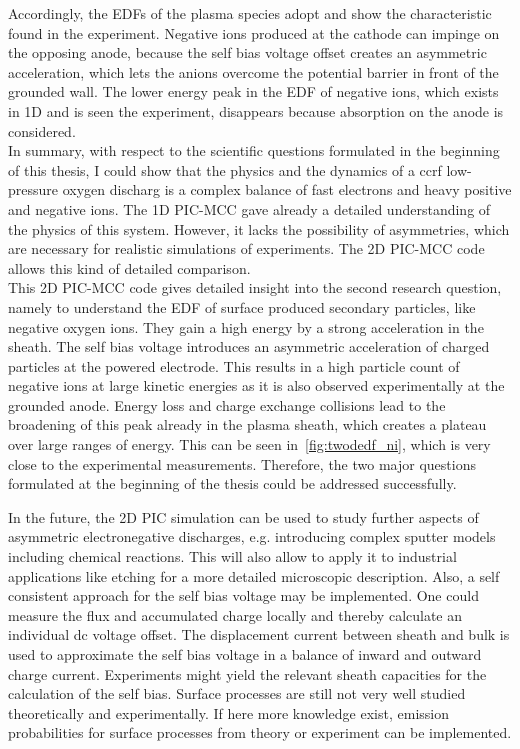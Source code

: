    Accordingly, the EDFs of the plasma species adopt and show the characteristic found in the experiment. Negative ions produced at the cathode can impinge on the opposing anode, because the self bias voltage offset creates an asymmetric acceleration, which lets the anions overcome the potential barrier in front of the grounded wall. The lower energy peak in the EDF of negative ions, which exists in 1D and is seen the experiment, disappears because absorption on the anode is considered.\\
    In summary, with respect to the scientific questions formulated in the beginning of this thesis, I could show that the physics and the dynamics of a ccrf low-pressure oxygen discharg is a complex balance of fast electrons and heavy positive and negative ions. The 1D PIC-MCC gave already a detailed understanding of the physics of this system. However, it lacks the possibility of asymmetries, which are necessary for realistic simulations of experiments. The 2D PIC-MCC code allows this kind of detailed comparison.\\
    This 2D PIC-MCC code gives detailed insight into the second research question, namely to understand the EDF of surface produced secondary particles, like negative oxygen ions. They gain a high energy by a strong acceleration in the sheath. The self bias voltage introduces an asymmetric acceleration of charged particles at the powered electrode. This results in a high particle count of negative ions at large kinetic energies as it is also observed experimentally at the grounded anode. Energy loss and charge exchange collisions lead to the broadening of this peak already in the plasma sheath, which creates a plateau over large ranges of energy. This can be seen in~\autoref{fig:twodedf_ni}, which is very close to the experimental measurements.
Therefore, the two major questions formulated at the beginning of the thesis could be addressed successfully.
%
    \par%
    In the future, the 2D PIC simulation can be used to study further aspects of asymmetric electronegative discharges, e.g. introducing complex sputter models including chemical reactions. This will also allow to apply it to industrial applications like etching for a more detailed microscopic description. Also, a self consistent approach for the self bias voltage may be implemented. One could measure the flux and accumulated charge locally and thereby calculate an individual dc voltage offset. The displacement current between sheath and bulk is used to approximate the self bias voltage in a balance of inward and outward charge current. Experiments might yield the relevant sheath capacities for the calculation of the self bias. Surface processes are still not very well studied theoretically and experimentally. If here more knowledge exist,  emission probabilities for surface processes from theory or experiment can be implemented.